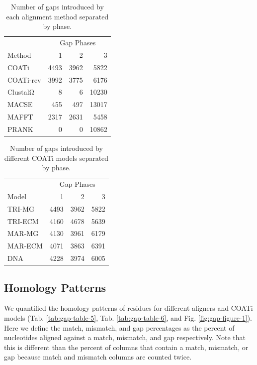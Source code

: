 \documentclass[
]{article}
\begin{document}
\begin{table}[H]
\centering
\caption{\label{tab:gap-table-3}Number of gaps introduced by each alignment method separated by phase.}
\centering
\begin{tabular}[t]{lrrr}
\toprule
\multicolumn{1}{c}{ } & \multicolumn{3}{c}{Gap Phases} \\
\cmidrule(l{3pt}r{3pt}){2-4}
Method & 1 & 2 & 3\\
\midrule
COATi & 4493 & 3962 & 5822\\
\addlinespace
COATi-rev & 3992 & 3775 & 6176\\
\addlinespace
ClustalΩ & 8 & 6 & 10230\\
\addlinespace
MACSE & 455 & 497 & 13017\\
\addlinespace
MAFFT & 2317 & 2631 & 5458\\
\addlinespace
PRANK & 0 & 0 & 10862\\
\bottomrule
\end{tabular}
\end{table}

\begin{table}[H]
\centering
\caption{\label{tab:gap-table-4}Number of gaps introduced by different COATi models separated by phase.}
\centering
\begin{tabular}[t]{lrrr}
\toprule
\multicolumn{1}{c}{ } & \multicolumn{3}{c}{Gap Phases} \\
\cmidrule(l{3pt}r{3pt}){2-4}
Model & 1 & 2 & 3\\
\midrule
TRI-MG & 4493 & 3962 & 5822\\
\addlinespace
TRI-ECM & 4160 & 4678 & 5639\\
\addlinespace
MAR-MG & 4130 & 3961 & 6179\\
\addlinespace
MAR-ECM & 4071 & 3863 & 6391\\
\addlinespace
DNA & 4228 & 3974 & 6005\\
\bottomrule
\end{tabular}
\end{table}

\subsection{Homology Patterns}\label{homology-patterns}

We quantified the homology patterns of residues for different aligners and COATi
models (Tab. \ref{tab:gap-table-5}, Tab. \ref{tab:gap-table-6}, and
Fig. \ref{fig:gap-figure-1}). Here we define the match, mismatch, and gap
percentages as the percent of nucleotides aligned against a match, mismatch,
and gap respectively. Note that this is different than the percent of columns
that contain a match, mismatch, or gap because match and mismatch columns are
counted twice.
\end{document}
